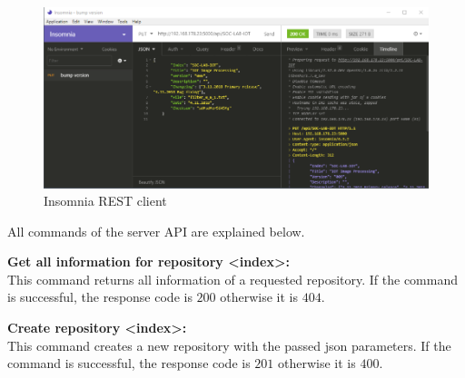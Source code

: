 \begin{figure}[htbp]
    \centering
    \includegraphics[width=1\textwidth]{images/insomnia.png}
    \caption{\label{fig:insomnia} Insomnia REST client}
\end{figure}

All commands of the server API are explained below.
\medbreak

\textbf{Get all information for repository <index>:}\\
This command returns all information of a requested repository. If the command is successful, the response code is $200$ otherwise it is $404$.

\begin{table}[htbp]
    \centering
\end{table}

\textbf{Create repository <index>:}\\
This command creates a new repository with the passed \gls{json} parameters. If the command is successful, the response code is $201$ otherwise it is $400$.

\begin{table}[htbp]
    \centering
\end{table}

